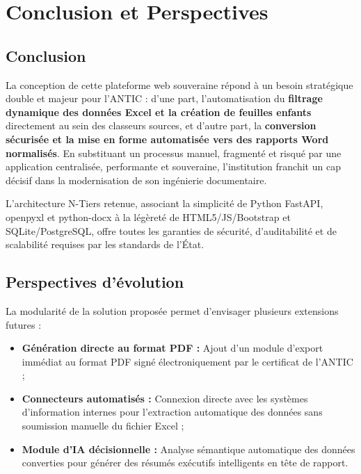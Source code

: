 \chapter{Conclusion et Perspectives}

\section{Conclusion}

La conception de cette plateforme web souveraine répond à un besoin stratégique double et majeur pour l'ANTIC : d'une part, l'automatisation du \textbf{filtrage dynamique des données Excel et la création de feuilles enfants} directement au sein des classeurs sources, et d'autre part, la \textbf{conversion sécurisée et la mise en forme automatisée vers des rapports Word normalisés}. En substituant un processus manuel, fragmenté et risqué par une application centralisée, performante et souveraine, l'institution franchit un cap décisif dans la modernisation de son ingénierie documentaire.

L'architecture N-Tiers retenue, associant la simplicité de Python FastAPI, openpyxl et python-docx à la légèreté de HTML5/JS/Bootstrap et SQLite/PostgreSQL, offre toutes les garanties de sécurité, d'auditabilité et de scalabilité requises par les standards de l'État.

\section{Perspectives d'évolution}

La modularité de la solution proposée permet d'envisager plusieurs extensions futures :
\begin{itemize}
    \item \textbf{Génération directe au format PDF :} Ajout d'un module d'export immédiat au format PDF signé électroniquement par le certificat de l'ANTIC ;
    \item \textbf{Connecteurs automatisés :} Connexion directe avec les systèmes d'information internes pour l'extraction automatique des données sans soumission manuelle du fichier Excel ;
    \item \textbf{Module d'IA décisionnelle :} Analyse sémantique automatique des données converties pour générer des résumés exécutifs intelligents en tête de rapport.
\end{itemize}
